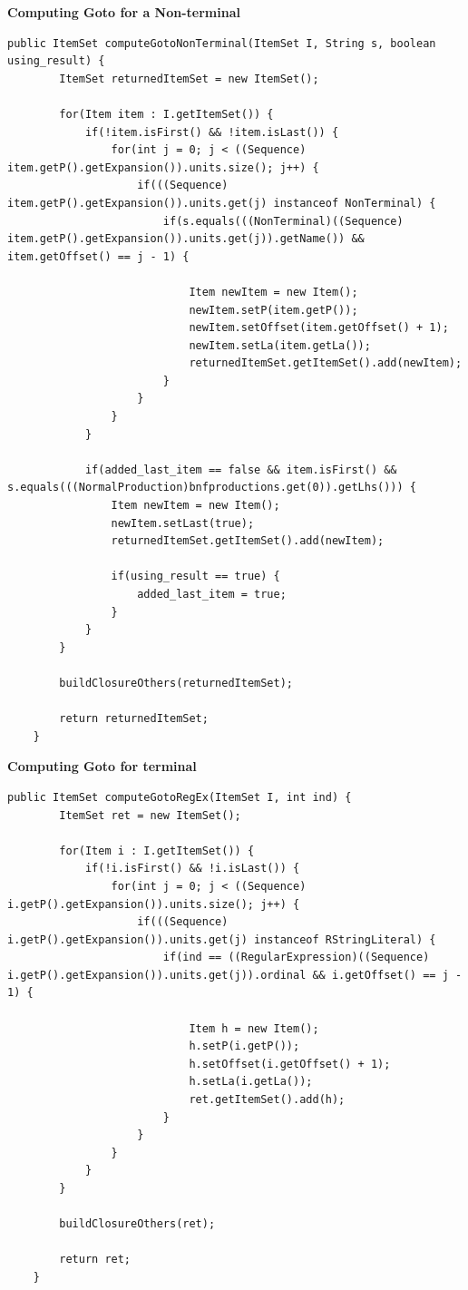 \documentclass[•]{book}
\begin{document}
\textbf{Computing Goto for a Non-terminal}
\begin{lstlisting}
public ItemSet computeGotoNonTerminal(ItemSet I, String s, boolean using_result) {
		ItemSet returnedItemSet = new ItemSet();
		
		for(Item item : I.getItemSet()) {
			if(!item.isFirst() && !item.isLast()) {
				for(int j = 0; j < ((Sequence) item.getP().getExpansion()).units.size(); j++) {
					if(((Sequence) item.getP().getExpansion()).units.get(j) instanceof NonTerminal) {
						if(s.equals(((NonTerminal)((Sequence) item.getP().getExpansion()).units.get(j)).getName()) && item.getOffset() == j - 1) {
							
							Item newItem = new Item();
							newItem.setP(item.getP());
							newItem.setOffset(item.getOffset() + 1);
							newItem.setLa(item.getLa());
							returnedItemSet.getItemSet().add(newItem);
						}
					}
				}
			}
			
			if(added_last_item == false && item.isFirst() && s.equals(((NormalProduction)bnfproductions.get(0)).getLhs())) {
				Item newItem = new Item();
				newItem.setLast(true);
				returnedItemSet.getItemSet().add(newItem);
				
				if(using_result == true) {
					added_last_item = true;
				}
			}
		}
		
		buildClosureOthers(returnedItemSet);
		
		return returnedItemSet;
	}
\end{lstlisting}
\textbf{Computing Goto for terminal}
\begin{lstlisting}
public ItemSet computeGotoRegEx(ItemSet I, int ind) {
		ItemSet ret = new ItemSet();
		
		for(Item i : I.getItemSet()) {
			if(!i.isFirst() && !i.isLast()) {
				for(int j = 0; j < ((Sequence) i.getP().getExpansion()).units.size(); j++) {
					if(((Sequence) i.getP().getExpansion()).units.get(j) instanceof RStringLiteral) {
						if(ind == ((RegularExpression)((Sequence) i.getP().getExpansion()).units.get(j)).ordinal && i.getOffset() == j - 1) {
						
							Item h = new Item();
							h.setP(i.getP());
							h.setOffset(i.getOffset() + 1);
							h.setLa(i.getLa());
							ret.getItemSet().add(h);
						}
					}
				}
			}
		}
		
		buildClosureOthers(ret);
		
		return ret;
	}
\end{lstlisting}
\end{document}
